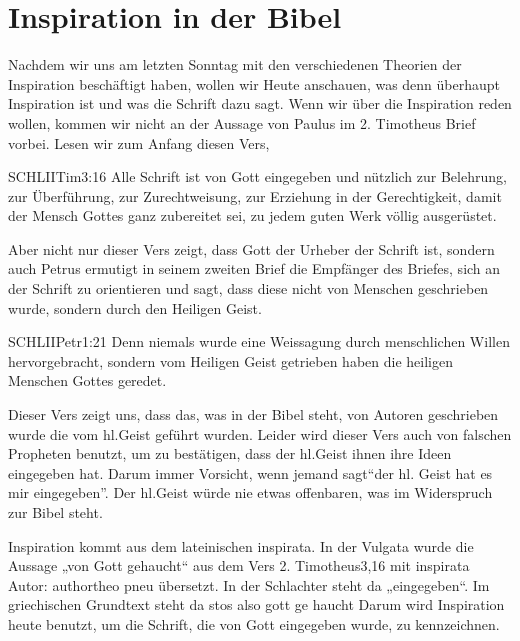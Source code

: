 \section{Inspiration in der Bibel}
Nachdem wir uns am letzten Sonntag mit den verschiedenen Theorien der Inspiration beschäftigt haben, wollen wir Heute anschauen, was denn überhaupt Inspiration ist und was die Schrift dazu sagt. Wenn wir über die Inspiration reden wollen, kommen wir nicht an der Aussage von Paulus im 2. Timotheus Brief vorbei. Lesen wir zum Anfang diesen Vers,
\begin{bibelbox}{SCHL}{IITim}{3:16}
Alle Schrift ist von Gott eingegeben und nützlich zur Belehrung, zur Überführung, zur Zurechtweisung, zur Erziehung in der Gerechtigkeit, damit der Mensch Gottes ganz zubereitet sei, zu jedem guten Werk völlig ausgerüstet.
\end{bibelbox}
Aber nicht nur dieser Vers zeigt, dass Gott der Urheber der Schrift ist, sondern auch Petrus ermutigt in seinem zweiten Brief die Empfänger des Briefes, sich an der Schrift zu orientieren und sagt, dass diese nicht von Menschen geschrieben wurde, sondern durch den Heiligen Geist.
\begin{bibelbox}{SCHL}{IIPetr}{1:21}
Denn niemals wurde eine Weissagung durch menschlichen Willen hervorgebracht, sondern vom Heiligen Geist getrieben haben die heiligen Menschen Gottes geredet.
\end{bibelbox}  
Dieser Vers zeigt uns, dass das, was in der Bibel steht, von Autoren geschrieben wurde die vom hl.Geist geführt wurden. Leider wird dieser Vers auch von falschen Propheten benutzt, um zu bestätigen, dass der hl.Geist ihnen ihre Ideen eingegeben hat. Darum immer Vorsicht, wenn jemand sagt\enquote{der hl. Geist hat es mir eingegeben}. Der hl.Geist würde nie etwas offenbaren, was im Widerspruch zur Bibel steht.

Inspiration kommt aus dem lateinischen inspirata. In der Vulgata wurde die Aussage „von Gott gehaucht“ aus dem Vers 2. Timotheus3,16 mit inspirata Autor: authortheo pneu übersetzt. In der Schlachter steht da „eingegeben“. Im griechischen Grundtext steht da stos also gott ge haucht Darum wird Inspiration heute benutzt, um die Schrift, die von Gott eingegeben wurde, zu kennzeichnen. 


